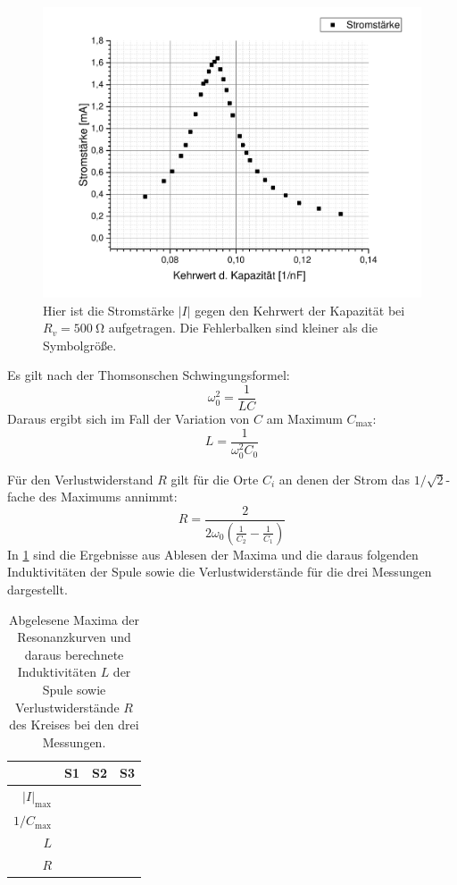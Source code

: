 \documentclass[
	a4paper,
	12pt,
	pagesize,
	ngerman
]{scrartcl}
\begin{document}
	\begin{figure}[H]
		\includegraphics[width=1\textwidth]{Serie_500}
		\centering
		\caption{Hier ist die Stromstärke $ \left| I \right| $ gegen den Kehrwert der Kapazität bei $ R_v = \SI{500}{\ohm} $ aufgetragen. Die Fehlerbalken sind kleiner als die Symbolgröße.}
		\label{Serie_500}
		\centering
	\end{figure} 
	Es gilt nach der Thomsonschen Schwingungsformel:
	\begin{equation}
		\omega_0^2=\frac{1}{LC}
	\end{equation}
	Daraus ergibt sich im Fall der Variation von $C$ am Maximum $ C_\text{max} $:
	\begin{equation}
		L=\frac{1}{\omega_0^2 C_0}
		\label{Thomson}
	\end{equation}
	
	Für den Verlustwiderstand $R$ gilt für die Orte $C_i$ an denen der Strom das $ 1/\sqrt{2} $-fache des Maximums annimmt:
	\begin{equation}
		R= \frac{2}{2\omega_0 \left( \frac{1}{C_2} - \frac{1}{C_1} \right)}
	\end{equation}
	In \cref{Serie_Erg} sind die Ergebnisse aus Ablesen der Maxima und die daraus folgenden Induktivitäten der Spule sowie die Verlustwiderstände für die drei Messungen dargestellt.
	
	\begin{table}[tb]
		\centering
		\begin{tabular}{ r | c | c | c }
			&S1 & S2 & S3 \\ \hline
			$\left| I \right|_\text{max}$ & & & \\ %
			$1/C_\text{max}$ & & & \\
			$L$ & & & \\
			$R$ & & & \\
		\end{tabular}
		\caption{Abgelesene Maxima der Resonanzkurven und daraus berechnete Induktivitäten $L$ der Spule sowie Verlustwiderstände $R$ des Kreises bei den drei Messungen.}
		\label{Serie_Erg} 
	\end{table}
	
\end{document}

